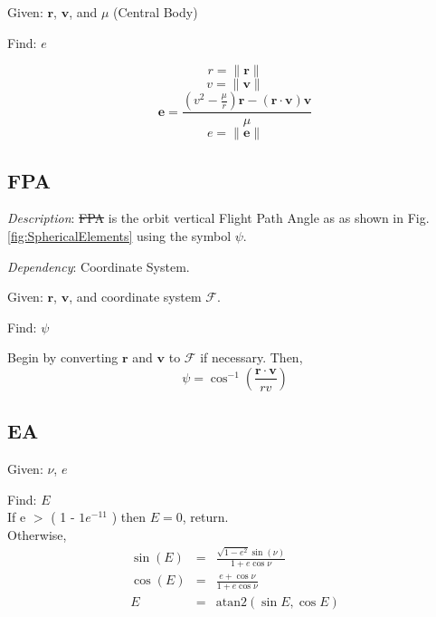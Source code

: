 \noindent Given:  $\mathbf{r}$, $\mathbf{v}$, and $\mu$ (Central
Body)

\noindent Find:  $e$

%
\begin{equation}
    r = \| \mathbf{r} \|
\end{equation}
%
\begin{equation}
    v = \| \mathbf{v} \|
\end{equation}
%
\begin{equation}
     \mathbf{e} = \displaystyle\frac{(v^2 - \displaystyle\frac{\mu}{r} )\mathbf{r}
     - (\mathbf{r}\cdot\mathbf{v}  )\mathbf{v}}{\mu} \label{Eq:EccentricityVector}
\end{equation}
%
\begin{equation}
     e = \| \mathbf{e} \|
\end{equation}

\subsection{FPA} 

\noindent \textit{Description}: \st{FPA} is the orbit vertical
Flight Path Angle as as shown in Fig. \ref{fig:SphericalElements}
using the symbol $\psi$.

\noindent \textit{Dependency}:  Coordinate System.

\noindent Given:  $\mathbf{r}$, $\mathbf{v}$, and coordinate system
$\mathcal{F}$.

\noindent Find:  $\psi$

Begin by converting  $\mathbf{r}$ and $\mathbf{v}$ to  $\mathcal{F}$
if necessary.  Then,
%
\begin{equation}
    \psi = \cos^{-1}\left(  \frac{\mathbf{r} \cdot \mathbf{v} }{r v} \right)
\end{equation}
%

\subsection{EA} \label{sec:EccentricAnomaly}

Given: $\nu$, $e$

\noindent Find:  $E$\\
%

\noindent If e $>$ ( 1 - $1e^{-11}$ ) then $E = 0$, return.\\
%


\noindent Otherwise,
%
\begin{eqnarray}
    \sin(E) & = & \frac{\sqrt{1 - e^2} \sin(\nu)}{1+e \cos{\nu}}    \\    %
    \cos(E) & = & \frac{ e + \cos{\nu} }{1+e \cos{\nu}}   \\     %
    E & = & \mbox{atan2}(\sin{E},\cos{E})
\end{eqnarray}
%

